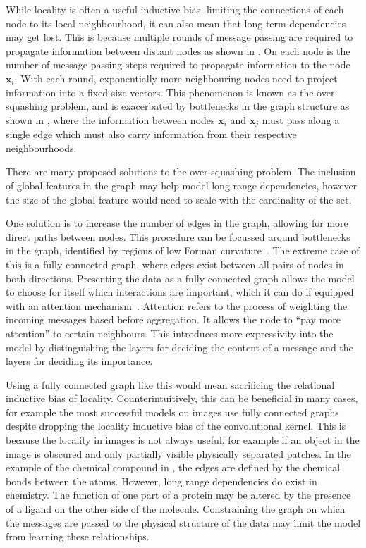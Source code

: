 While locality is often a useful inductive bias, limiting the connections of each node to its local neighbourhood, it can also mean that long term dependencies may get lost.
This is because multiple rounds of message passing are required to propagate information between distant nodes as shown in .
On each node is the number of message passing steps required to propagate information to the node $\mathbf{x}_i$.
With each round, exponentially more neighbouring nodes need to project information into a fixed-size vectors.
This phenomenon is known as the over-squashing problem, and is exacerbated by bottlenecks in the graph structure as shown in , where the information between nodes $\mathbf{x}_i$ and $\mathbf{x}_j$ must pass along a single edge which must also carry information from their respective neighbourhoods.

There are many proposed solutions to the over-squashing problem.
The inclusion of global features in the graph may help model long range dependencies, however the size of the global feature would need to scale with the cardinality of the set.

One solution is to increase the number of edges in the graph, allowing for more direct paths between nodes.
This procedure can be focussed around bottlenecks in the graph, identified by regions of low Forman curvature~.
The extreme case of this is a fully connected graph, where edges exist between all pairs of nodes in both directions.
Presenting the data as a fully connected graph allows the model to choose for itself which interactions are important, which it can do if equipped with an attention mechanism~.
Attention refers to the process of weighting the incoming messages based before aggregation.
It allows the node to ``pay more attention'' to certain neighbours.
This introduces more expressivity into the model by distinguishing the layers for deciding the content of a message and the layers for deciding its importance.

Using a fully connected graph like this would mean sacrificing the relational inductive bias of locality.
Counterintuitively, this can be beneficial in many cases, for example the most successful models on images use fully connected graphs~ despite dropping the locality inductive bias of the convolutional kernel.
This is because the locality in images is not always useful, for example if an object in the image is obscured and only partially visible physically separated patches.
In the example of the chemical compound in , the edges are defined by the chemical bonds between the atoms.
However, long range dependencies do exist in chemistry.
The function of one part of a protein may be altered by the presence of a ligand on the other side of the molecule.
Constraining the graph on which the messages are passed to the physical structure of the data may limit the model from learning these relationships.


